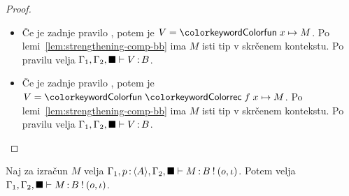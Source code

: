 \begin{proof}
\begin{itemize}
		\item Če je zadnje pravilo , potem je $V = \tmfunano{x}{M}$.
		Po lemi~\ref{lem:strengthening-comp-bb} ima $M$ isti tip v skrčenem kontekstu.
		Po pravilu  velja $\Gamma_1, \Gamma_2, \blacksquare \vdash V \mathinner{:} B$.
		
		\item Če je zadnje pravilo , potem je $V = \tmfunrecano{f}{x}{M}$.
		Po lemi~\ref{lem:strengthening-comp-bb} ima $M$ isti tip v skrčenem kontekstu.
		Po pravilu  velja $\Gamma_1, \Gamma_2, \blacksquare \vdash V \mathinner{:} B$.
		
	\end{itemize}
\end{proof}

\begin{lema}\label{lem:strengthening-comp-bb}
	Naj za izračun $M$ velja $\Gamma_1, p \mathinner{:} \langle A \rangle, \Gamma_2, \blacksquare \vdash M \mathinner{:} B \mathbin{!} (o, \iota)$. Potem velja $\Gamma_1, \Gamma_2, \blacksquare \vdash M \mathinner{:} B \mathbin{!} (o, \iota)$.
\end{lema}

